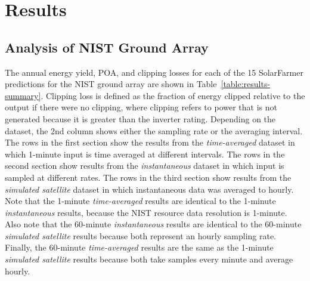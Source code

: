 \documentclass[conference]{IEEEtran}
\begin{document}
\section{Results}
\label{section:results}

\subsection{Analysis of NIST Ground Array}
The annual energy yield, POA, and clipping losses for each of the 15 SolarFarmer predictions for the NIST ground array are shown in Table~\ref{table:results-summary}. Clipping loss is defined as the fraction of energy clipped relative to the output if there were no clipping, where clipping refers to power that is not generated because it is greater than the inverter rating. Depending on the dataset, the 2nd column shows either the sampling rate or the averaging interval. The rows in the first section show the results from the \emph{time-averaged} dataset in which 1-minute input is time averaged at different intervals. The rows in the second section show results from the \emph{instantaneous} dataset in which input is sampled at different rates. The rows in the third section show results from the \emph{simulated satellite} dataset in which instantaneous data was averaged to hourly. Note that the 1-minute \emph{time-averaged} results are identical to the 1-minute \emph{instantaneous} results, because the NIST resource data resolution is 1-minute. Also note that the 60-minute \emph{instantaneous} results are identical to the 60-minute \emph{simulated satellite} results because both represent an hourly sampling rate. Finally, the 60-minute \emph{time-averaged} results are the same as the 1-minute \emph{simulated satellite} results because both take samples every minute and average hourly.
\end{document}
